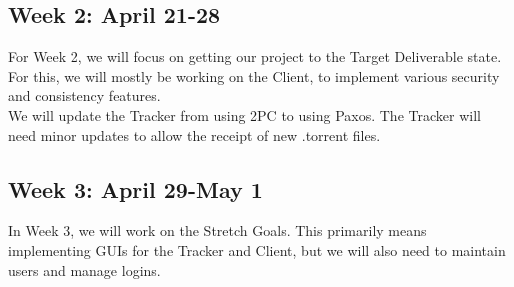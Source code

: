 \documentclass[12pt]{article}
\begin{document}
\subsection*{Week 2: April 21-28}
For Week 2, we will focus on getting our project to the Target Deliverable state.
For this, we will mostly be working on the Client, to implement various security
and consistency features. \\
We will update the Tracker from using 2PC to using Paxos.
The Tracker will need minor updates to allow the receipt of new .torrent files.

\subsection*{Week 3: April 29-May 1}
In Week 3, we will work on the Stretch Goals.
This primarily means implementing GUIs for the Tracker and Client,
but we will also need to maintain users and manage logins.
\end{document}
